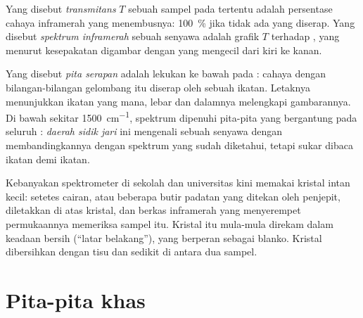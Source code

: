 \begin{definition}\label{def:g11:infrared:spectrum}
Yang disebut \emph{transmitans} $T$ sebuah sampel
pada  tertentu adalah persentase cahaya inframerah
yang menembusnya: \qty{100}{\percent} jika tidak ada yang diserap. Yang
disebut \emph{spektrum inframerah} sebuah
senyawa adalah grafik $T$ terhadap , yang menurut
kesepakatan digambar dengan  yang mengecil dari kiri
ke kanan.
\end{definition}

\begin{definition}\label{def:g11:infrared:band}
Yang disebut \emph{pita serapan} adalah lekukan ke
bawah pada : cahaya dengan bilangan-bilangan gelombang itu
diserap oleh sebuah ikatan. Letaknya menunjukkan ikatan yang mana, lebar
dan dalamnya melengkapi gambarannya. Di bawah sekitar
\qty{1500}{cm^{-1}}, spektrum dipenuhi pita-pita yang bergantung pada
seluruh : \emph{daerah sidik jari} ini
mengenali sebuah senyawa dengan membandingkannya dengan spektrum yang
sudah diketahui, tetapi sukar dibaca ikatan demi ikatan.
\end{definition}

\begin{inthelab}
Kebanyakan spektrometer di sekolah dan universitas kini memakai kristal
intan kecil: setetes cairan, atau beberapa butir padatan yang ditekan
oleh penjepit, diletakkan di atas kristal, dan berkas inframerah yang
menyerempet permukaannya memeriksa sampel itu. Kristal itu mula-mula
direkam dalam keadaan bersih (``latar belakang''), yang berperan sebagai
blanko. Kristal dibersihkan dengan tisu dan sedikit  di antara
dua sampel.
\end{inthelab}

\section{Pita-pita khas}

